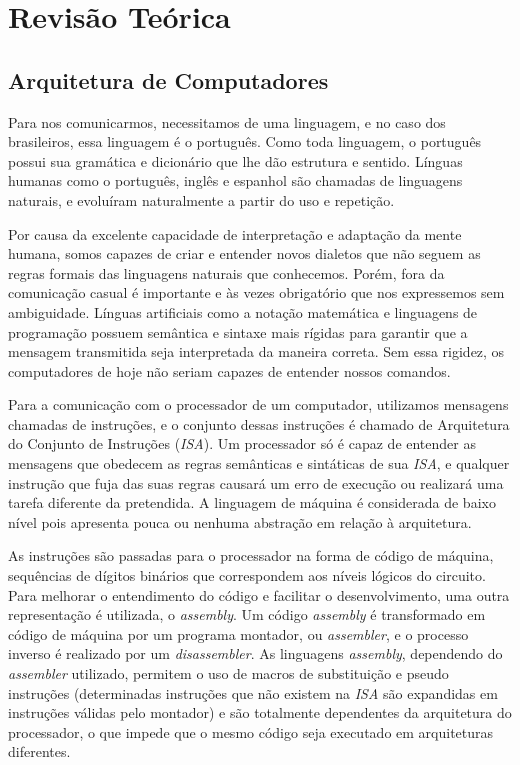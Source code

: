\chapter{Revisão Teórica}\label{cap_revisao}

\section{Arquitetura de Computadores}
{
    Para nos comunicarmos, necessitamos de uma linguagem, e no caso dos
    brasileiros, essa linguagem é o português. Como toda linguagem, o português
    possui sua gramática e dicionário que lhe dão estrutura e sentido.
    Línguas humanas como o português, inglês e espanhol são chamadas de
    linguagens naturais, e evoluíram naturalmente a partir do uso e
    repetição.~\cite{lyons1991natural}

    Por causa da excelente capacidade de interpretação e adaptação da mente
    humana, somos capazes de criar e entender novos dialetos que não seguem as
    regras formais das linguagens naturais que conhecemos. Porém, fora da
    comunicação casual é importante e às vezes obrigatório que nos expressemos
    sem ambiguidade. Línguas artificiais como a notação matemática e linguagens
    de programação possuem semântica e sintaxe mais rígidas para garantir que
    a mensagem transmitida seja interpretada da maneira correta. Sem essa
    rigidez, os computadores de hoje não seriam capazes de entender nossos
    comandos.
}

{
    Para a comunicação com o processador de um computador, utilizamos mensagens
    chamadas de instruções, e o conjunto dessas instruções é chamado de
    Arquitetura do Conjunto de Instruções (\textit{ISA}). Um processador só é
    capaz de entender as mensagens que obedecem as regras semânticas e
    sintáticas de sua \textit{ISA}, e qualquer instrução que fuja das suas
    regras causará um erro de execução ou realizará uma tarefa diferente da
    pretendida. A linguagem de máquina é considerada de baixo nível pois
    apresenta pouca ou nenhuma abstração em relação à arquitetura.

    As instruções são passadas para o processador na forma de código de
    máquina, sequências de dígitos binários que correspondem aos níveis lógicos
    do circuito. Para melhorar o entendimento do código e facilitar
    o desenvolvimento, uma outra representação é utilizada, o
    \textit{assembly}. Um código \textit{assembly} é transformado em código de
    máquina por um programa montador, ou \textit{assembler}, e o processo
    inverso é realizado por um \textit{disassembler}. As linguagens
    \textit{assembly}, dependendo do \textit{assembler} utilizado, permitem o
    uso de macros de substituição e pseudo instruções (determinadas instruções
    que não existem na \textit{ISA} são expandidas em instruções válidas pelo
    montador) e são totalmente dependentes da arquitetura do processador, o
    que impede que o mesmo código seja executado em arquiteturas diferentes.
}

